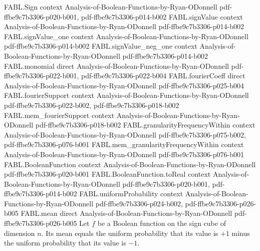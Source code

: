 \begin{theorem}
\label{FABL.mean_eq_probability_one_sub_probability_neg_one}
\leanok
{}
\proofstep
  {FABL.Sign}
  {context}
  {Analysis-of-Boolean-Functions-by-Ryan-ODonnell}
  {pdf-ffbe9c7b3306-p020-b001,
    pdf-ffbe9c7b3306-p014-b002}
\proofstep
  {FABL.signValue}
  {context}
  {Analysis-of-Boolean-Functions-by-Ryan-ODonnell}
  {pdf-ffbe9c7b3306-p014-b002}
\proofstep
  {FABL.signValue_one}
  {context}
  {Analysis-of-Boolean-Functions-by-Ryan-ODonnell}
  {pdf-ffbe9c7b3306-p014-b002}
\proofstep
  {FABL.signValue_neg_one}
  {context}
  {Analysis-of-Boolean-Functions-by-Ryan-ODonnell}
  {pdf-ffbe9c7b3306-p014-b002}
\proofstep
  {FABL.monomial}
  {direct}
  {Analysis-of-Boolean-Functions-by-Ryan-ODonnell}
  {pdf-ffbe9c7b3306-p022-b001,
    pdf-ffbe9c7b3306-p022-b004}
\proofstep
  {FABL.fourierCoeff}
  {direct}
  {Analysis-of-Boolean-Functions-by-Ryan-ODonnell}
  {pdf-ffbe9c7b3306-p025-b004}
\proofstep
  {FABL.fourierSupport}
  {context}
  {Analysis-of-Boolean-Functions-by-Ryan-ODonnell}
  {pdf-ffbe9c7b3306-p022-b002,
    pdf-ffbe9c7b3306-p018-b002}
\proofstep
  {FABL.mem_fourierSupport}
  {context}
  {Analysis-of-Boolean-Functions-by-Ryan-ODonnell}
  {pdf-ffbe9c7b3306-p018-b002}
\proofstep
  {FABL.granularityFrequencyWithin}
  {context}
  {Analysis-of-Boolean-Functions-by-Ryan-ODonnell}
  {pdf-ffbe9c7b3306-p075-b002,
    pdf-ffbe9c7b3306-p076-b001}
\proofstep
  {FABL.mem_granularityFrequencyWithin}
  {context}
  {Analysis-of-Boolean-Functions-by-Ryan-ODonnell}
  {pdf-ffbe9c7b3306-p076-b001}
\proofstep
  {FABL.BooleanFunction}
  {context}
  {Analysis-of-Boolean-Functions-by-Ryan-ODonnell}
  {pdf-ffbe9c7b3306-p020-b001}
\proofstep
  {FABL.BooleanFunction.toReal}
  {context}
  {Analysis-of-Boolean-Functions-by-Ryan-ODonnell}
  {pdf-ffbe9c7b3306-p020-b001,
    pdf-ffbe9c7b3306-p014-b002}
\proofstep
  {FABL.uniformProbability}
  {context}
  {Analysis-of-Boolean-Functions-by-Ryan-ODonnell}
  {pdf-ffbe9c7b3306-p024-b002,
    pdf-ffbe9c7b3306-p026-b005}
\proofstep
  {FABL.mean}
  {direct}
  {Analysis-of-Boolean-Functions-by-Ryan-ODonnell}
  {pdf-ffbe9c7b3306-p026-b005}
Let $f$ be a Boolean function on the sign cube of dimension $n$. Its mean equals the
uniform probability that its value is $+1$ minus the uniform probability that its value
is $-1$.
\end{theorem}

